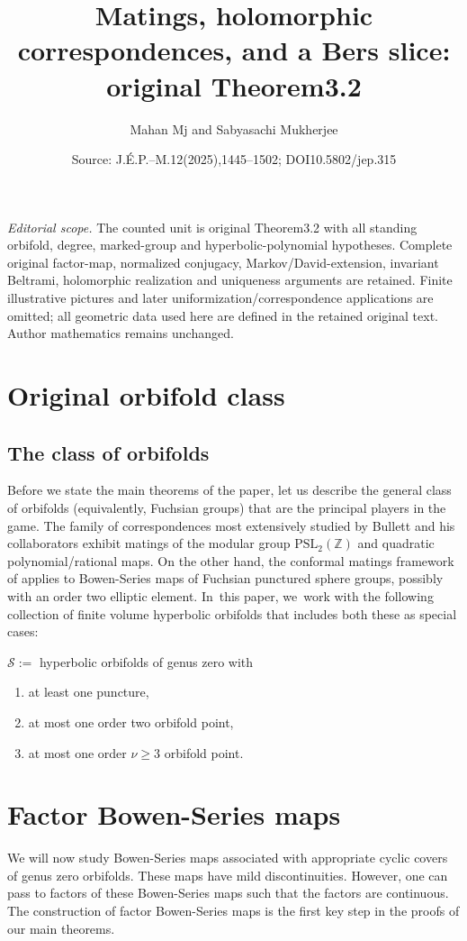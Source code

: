 \documentclass[10pt,a4paper]{amsart}
\title[Conformal factor-map mating]{Matings, holomorphic correspondences, and a Bers slice: original Theorem3.2}
\author{Mahan Mj and Sabyasachi Mukherjee}
\date{Source: J.\'E.P.--M.12(2025),1445--1502; DOI10.5802/jep.315}
\theoremstyle{definition}
\theoremstyle{remark}
\newcommand{\Z}{\mathbb{Z}}
\newcommand{\cS}{\mathcal{S}}
\begin{document}
\maketitle
\noindent\textit{Editorial scope.} The counted unit is original Theorem3.2 with all standing orbifold, degree, marked-group and hyperbolic-polynomial hypotheses. Complete original factor-map, normalized conjugacy, Markov/David-extension, invariant Beltrami, holomorphic realization and uniqueness arguments are retained. Finite illustrative pictures and later uniformization/correspondence applications are omitted; all geometric data used here are defined in the retained original text. Author mathematics remains unchanged.
\section{Original orbifold class}\label{intro_sec}
\subsection*{The class of orbifolds}
Before we state the main theorems of the paper, let us describe the general class of orbifolds (equivalently, Fuchsian groups) that are the principal players in the game.
The family of correspondences most extensively studied by Bullett and his collaborators exhibit matings of the modular group $\mathrm{PSL}_2(\Z)$ and quadratic polynomial/rational maps. On the other hand, the conformal matings framework of \cite{MM1} applies to Bowen-Series maps of Fuchsian punctured sphere groups, possibly with an order two elliptic element. In~this paper, we~work with the following collection
of finite volume hyperbolic orbifolds that includes both these as special cases:

$\cS:=$ hyperbolic orbifolds of genus zero with
\begin{enumerate}
\item at least one puncture,
\item at most one order two orbifold point,
\item at most one order $\nu\geq 3$ orbifold point.
\end{enumerate}


\section{Factor Bowen-Series maps}\label{factor_bs_sec}

We will now study Bowen-Series maps associated with appropriate cyclic covers of genus zero orbifolds. These maps have mild discontinuities. However, one can pass to factors of these Bowen-Series maps such that the factors are continuous. The construction of factor Bowen-Series maps is the first key step in the proofs of our main theorems.
\end{document}

